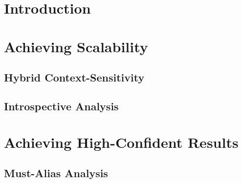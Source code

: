 \documentclass[ack,preface]{diphdthesis}
\begin{document}
\frontmatter

\mainmatter

\chapter{Introduction}


\chapter{Achieving Scalability}

\section{Hybrid Context-Sensitivity}


\section{Introspective Analysis}


\chapter{Achieving High-Confident Results}

\section{Must-Alias Analysis}
\end{document}
